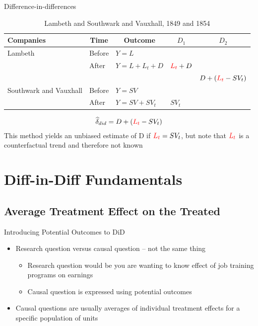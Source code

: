 \documentclass{beamer}
\begin{document}
\begin{frame}{Difference-in-differences}

\begin{table}\centering
\scriptsize
		\caption{Lambeth and Southwark and Vauxhall, 1849 and 1854}
		\begin{center}
		\begin{tabular}{lll|lc}
		\toprule
		\multicolumn{1}{l}{\textbf{Companies}}&
		\multicolumn{1}{c}{\textbf{Time}}&
		\multicolumn{1}{c}{\textbf{Outcome}}&
		\multicolumn{1}{c}{$D_1$}&
		\multicolumn{1}{c}{$D_2$}\\
		\midrule
		Lambeth & Before & $Y=L$ \\
		& After & $Y=L + L_t + D$ & $\textcolor{red}{L_t}+D$\\
		\midrule
		& & & & $D + (\textcolor{red}{L_t}- SV_t)$ \\
		\midrule
		Southwark and Vauxhall & Before & $Y=SV$ \\
		& After & $Y=SV + SV_t$ & $SV_t$\\
		\bottomrule
		\end{tabular}
		\end{center}
	\end{table}

\begin{eqnarray*}
\widehat{\delta}_{did} = D + (\textcolor{red}{L_t}- SV_t)
\end{eqnarray*}This method yields an unbiased estimate of D if $\textcolor{red}{L_t} = SV_t$, but note that $\textcolor{red}{L_t}$ is a counterfactual trend and therefore not known

\end{frame}

\section{Diff-in-Diff Fundamentals}

\subsection{Average Treatment Effect on the Treated}

\begin{frame}{Introducing Potential Outcomes to DiD}

\begin{itemize}
\item Research question versus causal question -- not the same thing
	\begin{itemize}
	\item Research question would be you are wanting to know effect of job training programs on earnings
	\item Causal question is expressed using potential outcomes
	\end{itemize}
\item Causal questions are usually averages of individual treatment effects for a specific population of units
\end{itemize}

\end{frame}
\end{document}
